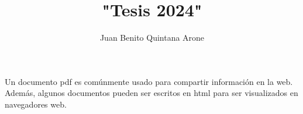 \documentclass[12pt,a4paper,oneside]{book}
\author{Juan Benito Quintana Arone}
\title{"Tesis 2024"}
\begin{document}
\frontmatter
    
    
    
    
    
    \tableofcontents
    \newpage
	\listoftables
	\newpage
	\listoffigures
	\newpage
    

\mainmatter     
    
    
    
    

    
    
    
    
    
    
     
    
Un documento \ac{pdf} es comúnmente usado para compartir información en la web. Además, algunos documentos pueden ser escritos en \ac{html} para ser visualizados en navegadores web.
\cite{Einstein1905}
\backmatter
    \appendix
    
    \printbibliography
\end{document}
